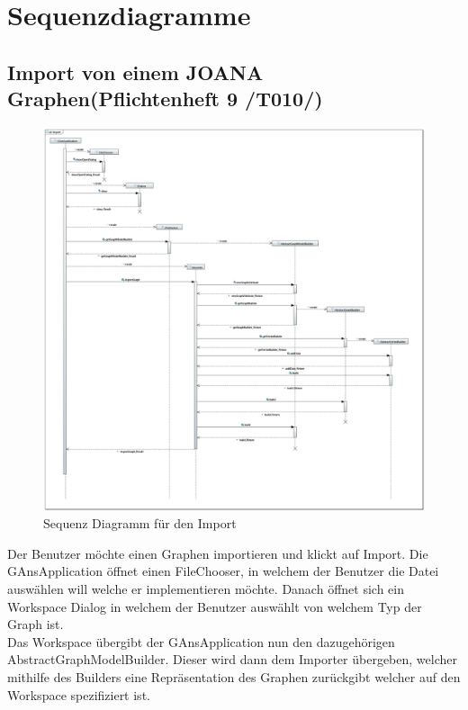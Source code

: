 \chapter{Sequenzdiagramme}

\section{Import von einem JOANA Graphen(Pflichtenheft 9 /T010/)}

\begin{figure}[hb]
  \centering
  \includegraphics[width=380pt]{resourcen/SeqDiagramImport.PNG}
  \caption{Sequenz Diagramm für den Import}
  \label{fig:gui_view_treeview}
\end{figure}

Der Benutzer möchte einen Graphen importieren und klickt auf Import. Die GAnsApplication öffnet einen FileChooser, in welchem der Benutzer die Datei auswählen will welche er implementieren möchte. Danach öffnet sich ein Workspace Dialog in welchem der Benutzer auswählt von welchem Typ der Graph ist.\\
Das Workspace übergibt der GAnsApplication nun den dazugehörigen AbstractGraphModelBuilder. Dieser wird dann dem Importer übergeben, welcher mithilfe des Builders eine Repräsentation des Graphen zurückgibt welcher auf den Workspace spezifiziert ist.

